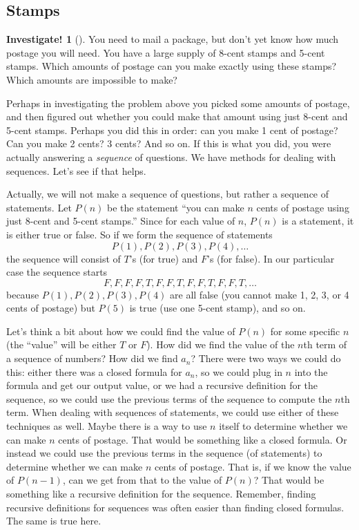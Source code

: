 \documentclass[10pt,]{book}
\theoremstyle{plain}
\theoremstyle{definition}
\theoremstyle{definition}
\theoremstyle{definition}
\newtheorem{investigation}[project]{Investigate!}
\theoremstyle{definition}
\numberwithin{equation}{chapter}
\begin{document}
\subsection[{Stamps}]{Stamps}\label{subsec_induction-stamps}
\begin{investigation}[]\label{investigation-16}
\hypertarget{p-2196}{}%
You need to mail a package, but don't yet know how much postage you will need. You have a large supply of 8-cent stamps and 5-cent stamps. Which amounts of postage can you make exactly using these stamps? Which amounts are impossible to make?%
\end{investigation}
\hypertarget{p-2197}{}%
Perhaps in investigating the problem above you picked some amounts of postage, and then figured out whether you could make that amount using just 8-cent and 5-cent stamps. Perhaps you did this in order: can you make 1 cent of postage? Can you make 2 cents? 3 cents? And so on. If this is what you did, you were actually answering a \emph{sequence} of questions. We have methods for dealing with sequences. Let's see if that helps.%
\par
\hypertarget{p-2198}{}%
Actually, we will not make a sequence of questions, but rather a sequence of statements. Let \(P(n)\)\label{notation-36}
 be the statement ``you can make \(n\) cents of postage using just 8-cent and 5-cent stamps.'' Since for each value of \(n\), \(P(n)\) is a statement, it is either true or false. So if we form the sequence of statements%
\begin{equation*}
P(1), P(2), P(3), P(4), \ldots
\end{equation*}
the sequence will consist of \(T\)'s (for true) and \(F\)'s (for false). In our particular case the sequence starts%
\begin{equation*}
F,F,F,F,T,F,F,T,F,F,T,F,F,T,\ldots
\end{equation*}
because \(P(1), P(2), P(3), P(4)\) are all false (you cannot make 1, 2, 3, or 4 cents of postage) but \(P(5)\) is true (use one 5-cent stamp), and so on.%
\par
\hypertarget{p-2199}{}%
Let's think a bit about how we could find the value of \(P(n)\) for some specific \(n\) (the ``value'' will be either \(T\) or \(F\)). How did we find the value of the \(n\)th term of a sequence of numbers? How did we find \(a_n\)? There were two ways we could do this: either there was a closed formula for \(a_n\), so we could plug in \(n\) into the formula and get our output value, or we had a recursive definition for the sequence, so we could use the previous terms of the sequence to compute the \(n\)th term. When dealing with sequences of statements, we could use either of these techniques as well. Maybe there is a way to use \(n\) itself to determine whether we can make \(n\) cents of postage. That would be something like a closed formula. Or instead we could use the previous terms in the sequence (of statements) to determine whether we can make \(n\) cents of postage. That is, if we know the value of \(P(n-1)\), can we get from that to the value of \(P(n)\)? That would be something like a recursive definition for the sequence. Remember, finding recursive definitions for sequences was often easier than finding closed formulas. The same is true here.%
\end{document}

